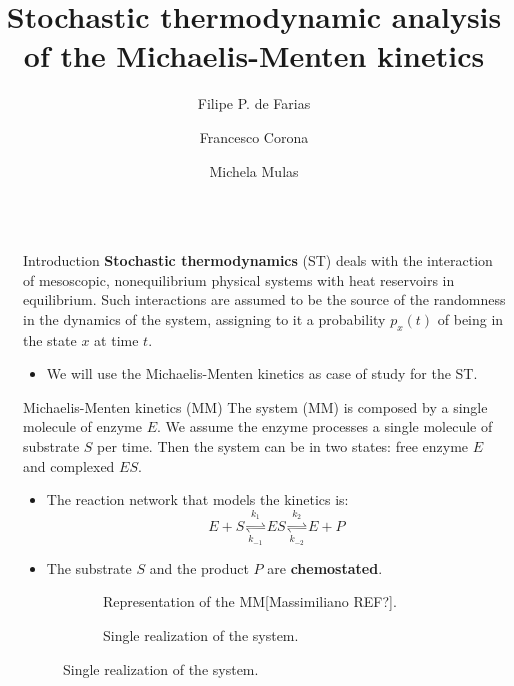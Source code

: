 \documentclass[final]{beamer}
\title{Stochastic thermodynamic analysis of the Michaelis-Menten kinetics}
\author{Filipe P. de Farias\inst{1} \and Francesco Corona\inst{1}  \and Michela Mulas\inst{1}}
\institute[shortinst]{\inst{1}Dept.}
\newlength{\sepwidth}
\newlength{\colwidth}
\newcommand{\separatorcolumn}{\begin{column}{\sepwidth}\end{column}}
\begin{document}
\setlength{\abovedisplayskip}{40pt}
\setlength{\belowdisplayskip}{40pt}

\begin{frame}[t]
\begin{columns}[t]
\separatorcolumn

\begin{column}{\colwidth}

  \begin{block}{Introduction}
{\bf Stochastic thermodynamics} (ST) deals with the interaction of mesoscopic, nonequilibrium physical systems with heat reservoirs in equilibrium.\cite{peliti2021stochastic} Such interactions are assumed to be the source of the randomness in the dynamics of the system, assigning to it a probability $p_x(t)$ of being in the state $x$ at time $t$.
\begin{itemize}
\item We will use the Michaelis-Menten kinetics as case of study for the ST.
\end{itemize}
\end{block}

\begin{alertblock}{Michaelis-Menten kinetics (MM)}
The system (MM) is composed by a single molecule of enzyme $E$. We assume the enzyme processes a single molecule of substrate $S$ per time. Then the system can be in two states: free enzyme $E$ and complexed $ES$.
\begin{itemize}
\item The reaction network that models the kinetics is:
\begin{equation}
E + S \underset{k_{-1}}{\stackrel{k_1}{\rightleftharpoons}} ES \underset{k_{-2}}{\stackrel{k_2}{\rightleftharpoons}} E + P
\end{equation}
\item The substrate $S$ and the product $P$ are {\bf chemostated}.
\end{itemize}
\end{alertblock}

\begin{figure}
\begin{subfigure}[b]{0.45\textwidth}
\label{fig 2-state-system}

\caption{Representation of the MM[Massimiliano REF?].}
\end{subfigure}
\hfill
\begin{subfigure}[b]{0.45\textwidth}
\label{fig 2-state-system}

\caption{Single realization of the system.}
\end{subfigure}
\end{figure}



\end{column}
\end{columns}
\end{frame}
\end{document}
